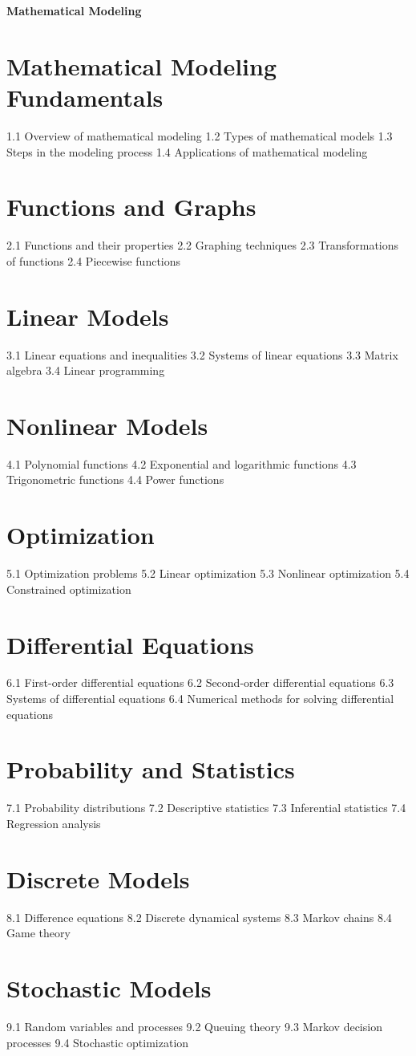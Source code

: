 {\LARGE \bf{Mathematical Modeling}}
\section{Mathematical Modeling Fundamentals}
1.1 Overview of mathematical modeling
1.2 Types of mathematical models
1.3 Steps in the modeling process
1.4 Applications of mathematical modeling
\section{Functions and Graphs}
2.1 Functions and their properties
2.2 Graphing techniques
2.3 Transformations of functions
2.4 Piecewise functions
\section{Linear Models}
3.1 Linear equations and inequalities
3.2 Systems of linear equations
3.3 Matrix algebra
3.4 Linear programming
\section{Nonlinear Models}
4.1 Polynomial functions
4.2 Exponential and logarithmic functions
4.3 Trigonometric functions
4.4 Power functions
\section{Optimization}
5.1 Optimization problems
5.2 Linear optimization
5.3 Nonlinear optimization
5.4 Constrained optimization
\section{Differential Equations}
6.1 First-order differential equations
6.2 Second-order differential equations
6.3 Systems of differential equations
6.4 Numerical methods for solving differential equations
\section{Probability and Statistics}
7.1 Probability distributions
7.2 Descriptive statistics
7.3 Inferential statistics
7.4 Regression analysis
\section{Discrete Models}
8.1 Difference equations
8.2 Discrete dynamical systems
8.3 Markov chains
8.4 Game theory
\section{Stochastic Models}
9.1 Random variables and processes
9.2 Queuing theory
9.3 Markov decision processes
9.4 Stochastic optimization
